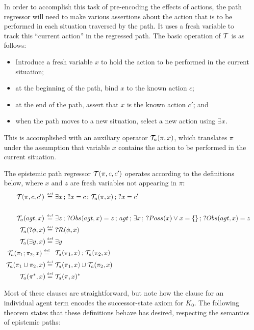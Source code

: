In order to accomplish this task of pre-encoding the effects of actions,
the path regressor will need to make various assertions about the
action that is to be performed in each situation traversed by the
path. It uses a fresh variable to track this {}``current action''
in the regressed path. The basic operation of $\mathcal{T}$ is as follows:

\begin{itemize}
\item Introduce a fresh variable $x$ to hold the action to be performed
in the current situation; 
\item at the beginning of the path, bind $x$ to the known action $c$; 
\item at the end of the path, assert that $x$ is the known action $c'$;
and 
\item when the path moves to a new situation, select a new action using
$\exists x$. 
\end{itemize}
This is accomplished with an auxiliary operator $\mathcal{T}_{a}(\pi,x)$, which
translates $\pi$ under the assumption that variable $x$ contains
the action to be performed in the current situation.

\begin{defnL}
 The
epistemic path regressor $\mathcal{T}(\pi,c,c')$ operates according to the
definitions below, where $x$ and $z$ are fresh variables not appearing
in $\pi$:\begin{align*}
\mathcal{T}(\pi,c,c')\,\stackrel{\mbox{\tiny def}}{=}\,\, & \exists x\,;\,?x=c\,;\,\mathcal{T}_{a}(\pi,x)\,;\,?x=c'\\
\\\mathcal{T}_{a}(agt,x)\,\stackrel{\mbox{\tiny def}}{=}\,\, & \exists z\,;\,?Obs(agt,x)=z\,;\, agt\,;\,\exists x\,;\,?Poss(x)\vee x=\{\}\,;\,?Obs(agt,x)=z\\
\mathcal{T}_{a}(?\phi,x)\stackrel{\mbox{\tiny def}}{=}\,\, & ?\mathcal{R}(\phi,x)\\
\mathcal{T}_{a}(\exists y,x)\stackrel{\mbox{\tiny def}}{=}\,\, & \exists y\\
\begin{array}{c}
\mathcal{T}_{a}(\pi_{1};\pi_{2},x)\stackrel{\mbox{\tiny def}}{=}\,\,\end{array} & \mathcal{T}_{a}(\pi_{1},x)\,;\,\mathcal{T}_{a}(\pi_{2},x)\\
\mathcal{T}_{a}(\pi_{1}\cup\pi_{2},x)\stackrel{\mbox{\tiny def}}{=}\,\, & \mathcal{T}_{a}(\pi_{1},x)\cup\mathcal{T}_{a}(\pi_{2},x)\\
\mathcal{T}_{a}(\pi^{*},x)\stackrel{\mbox{\tiny def}}{=}\,\, & \mathcal{T}_{a}(\pi,x)^{*}\end{align*}

\end{defnL}
Most of these clauses are straightforward, but note how the clause
for an individual agent term encodes the successor-state axiom for
$K_{0}$. The following theorem states that these definitions behave
has desired, respecting the semantics of epistemic paths:


